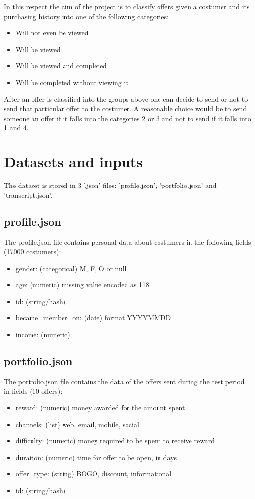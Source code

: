 \documentclass[10pt,oneside,a4paper]{report}
\begin{document}
In this respect the aim of the project is to classify offers given a costumer and its purchasing history into one of the following categories:
\begin{itemize}
	\item Will not even be viewed
	\item Will be viewed
	\item Will be viewed and completed
	\item Will be completed without viewing it
\end{itemize}

After an offer is classified into the groups above one can decide to send or not to send that particular offer to the costumer. A reasonable choice would be to send someone an offer if it falls into the categories 2 or 3 and not to send if it falls into 1 and 4. 

\section*{Datasets and inputs}

The dataset is stored in 3 '.json' files: 'profile.json', 'portfolio.json' and 'transcript.json'. 
\subsection*{profile.json}
The profile.json file contains personal data about costumers in the following fields (17000 costumers):
\begin{itemize}
	\item gender: (categorical) M, F, O or null
	\item age: (numeric) missing value encoded as 118
	\item id: (string/hash)
	\item became\_member\_on: (date) format YYYYMMDD
	\item income: (numeric)
\end{itemize}

\subsection*{portfolio.json}
The portfolio.json file contains the data of the offers sent during the test period in fields (10 offers): 
\begin{itemize}
	\item reward: (numeric) money awarded for the amount spent
	\item channels: (list) web, email, mobile, social
	\item difficulty: (numeric) money required to be spent to receive reward
	\item duration: (numeric) time for offer to be open, in days
	\item offer\_type: (string) BOGO, discount, informational
	\item id: (string/hash)
\end{itemize}
\end{document}
